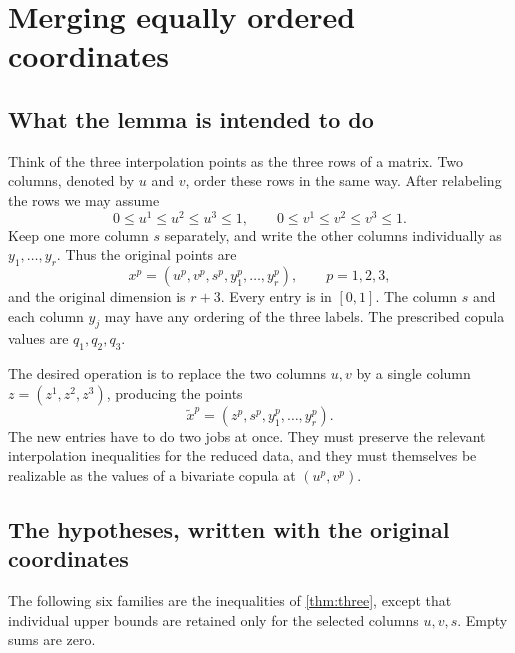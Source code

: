 \documentclass[a4paper,11pt]{amsart}
\numberwithin{equation}{section}
\theoremstyle{definition}
\theoremstyle{remark}
\begin{document}
\section{Merging equally ordered coordinates}\label{sec:merging}
\subsection{What the lemma is intended to do}
Think of the three interpolation points as the three rows of a matrix.
Two columns, denoted by $u$ and $v$, order these rows in the same way.
After relabeling the rows we may assume
\[
0\le u^1\le u^2\le u^3\le1,
\qquad 0\le v^1\le v^2\le v^3\le1.
\]
Keep one more column $s$ separately, and write the other columns individually
as $y_1,\ldots,y_r$. Thus the original points are
\[
 x^p=(u^p,v^p,s^p,y_1^p,\ldots,y_r^p),\qquad p=1,2,3,
\]
and the original dimension is $r+3$. Every entry is in $[0,1]$.
The column $s$ and each column $y_j$ may have any ordering of the three labels.
The prescribed copula values are $q_1,q_2,q_3$.

The desired operation is to replace the two columns $u,v$ by a single column
$z=(z^1,z^2,z^3)$, producing the points
\[
 \widetilde x^p=(z^p,s^p,y_1^p,\ldots,y_r^p).
\]
The new entries have to do two jobs at once. They must preserve the relevant
interpolation inequalities for the reduced data, and they must themselves
be realizable as the values of a bivariate copula at $(u^p,v^p)$.



\subsection{The hypotheses, written with the original coordinates}
The following six families are the inequalities of
\cref{thm:three}, except that individual upper bounds are retained only
for the selected columns $u,v,s$. Empty sums are zero.\\
\end{document}

